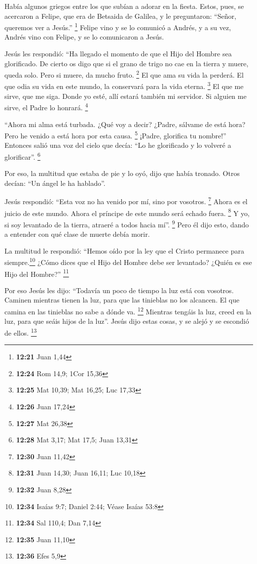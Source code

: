 \begin{paracol}{2}
 Había algunos griegos entre los que subían a adorar en
la fiesta.  Estos, pues, se acercaron a Felipe, que era
de Betsaida de Galilea, y le preguntaron: ``Señor, queremos ver a
Jesús.'' \footnote{\textbf{12:21} Juan 1,44}  Felipe vino
y se lo comunicó a Andrés, y a su vez, Andrés vino con Felipe, y se lo
comunicaron a Jesús.

 Jesús les respondió: ``Ha llegado el momento de que el
Hijo del Hombre sea glorificado.  De cierto os digo que
si el grano de trigo no cae en la tierra y muere, queda solo. Pero si
muere, da mucho fruto. \footnote{\textbf{12:24} Rom 14,9; 1Cor 15,36}
 El que ama su vida la perderá. El que odia su vida en
este mundo, la conservará para la vida eterna. \footnote{\textbf{12:25}
  Mat 10,39; Mat 16,25; Luc 17,33}  El que me sirve, que
me siga. Donde yo esté, allí estará también mi servidor. Si alguien me
sirve, el Padre lo honrará. \footnote{\textbf{12:26} Juan 17,24}

 ``Ahora mi alma está turbada. ¿Qué voy a decir? ¿Padre,
sálvame de está hora? Pero he venido a está hora por esta causa.
\footnote{\textbf{12:27} Mat 26,38}  ¡Padre, glorifica tu
nombre!'' Entonces salió una voz del cielo que decía: ``Lo he
glorificado y lo volveré a glorificar''. \footnote{\textbf{12:28} Mat
  3,17; Mat 17,5; Juan 13,31}

 Por eso, la multitud que estaba de pie y lo oyó, dijo
que había tronado. Otros decían: ``Un ángel le ha hablado''.

 Jesús respondió: ``Esta voz no ha venido por mí, sino
por vosotros. \footnote{\textbf{12:30} Juan 11,42}  Ahora
es el juicio de este mundo. Ahora el príncipe de este mundo será echado
fuera. \footnote{\textbf{12:31} Juan 14,30; Juan 16,11; Luc 10,18}
 Y yo, si soy levantado de la tierra, atraeré a todos
hacia mí''. \footnote{\textbf{12:32} Juan 8,28}  Pero él
dijo esto, dando a entender con qué clase de muerte debía morir.

 La multitud le respondió: ``Hemos oído por la ley que el
Cristo permanece para siempre.\footnote{\textbf{12:34} Isaías 9:7;
  Daniel 2:44; Véase Isaías 53:8} ¿Cómo dices que el Hijo del Hombre
debe ser levantado? ¿Quién es ese Hijo del Hombre?'' \footnote{\textbf{12:34}
  Sal 110,4; Dan 7,14}

 Por eso Jesús les dijo: ``Todavía un poco de tiempo la
luz está con vosotros. Caminen mientras tienen la luz, para que las
tinieblas no los alcancen. El que camina en las tinieblas no sabe a
dónde va. \footnote{\textbf{12:35} Juan 11,10}  Mientras
tengáis la luz, creed en la luz, para que seáis hijos de la luz''. Jesús
dijo estas cosas, y se alejó y se escondió de ellos. \footnote{\textbf{12:36}
  Efes 5,9}


\end{paracol}
